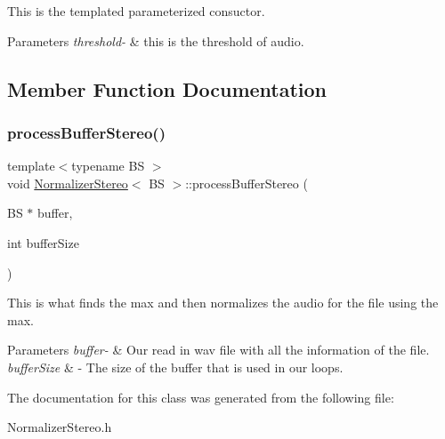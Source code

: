 This is the templated parameterized consuctor. 
\begin{DoxyParams}{Parameters}
{\em threshold-\/} & this is the threshold of audio. \\
\hline
\end{DoxyParams}


\subsection{Member Function Documentation}
\mbox{\label{classNormalizerStereo_af6fb357ed8edaa88898280e1734d933e}} 
\subsubsection{\texorpdfstring{process\+Buffer\+Stereo()}{processBufferStereo()}}
{\footnotesize\ttfamily template$<$typename BS $>$ \\
void \hyperlink{classNormalizerStereo}{Normalizer\+Stereo}$<$ BS $>$\+::process\+Buffer\+Stereo (\begin{DoxyParamCaption}\item[{BS $\ast$}]{buffer,  }\item[{int}]{buffer\+Size }\end{DoxyParamCaption})}

This is what finds the max and then normalizes the audio for the file using the max. 
\begin{DoxyParams}{Parameters}
{\em buffer-\/} & Our read in wav file with all the information of the file. \\
\hline
{\em buffer\+Size} & -\/ The size of the buffer that is used in our loops. \\
\hline
\end{DoxyParams}


The documentation for this class was generated from the following file\+:\begin{DoxyCompactItemize}
\item 
Normalizer\+Stereo.\+h\end{DoxyCompactItemize}
